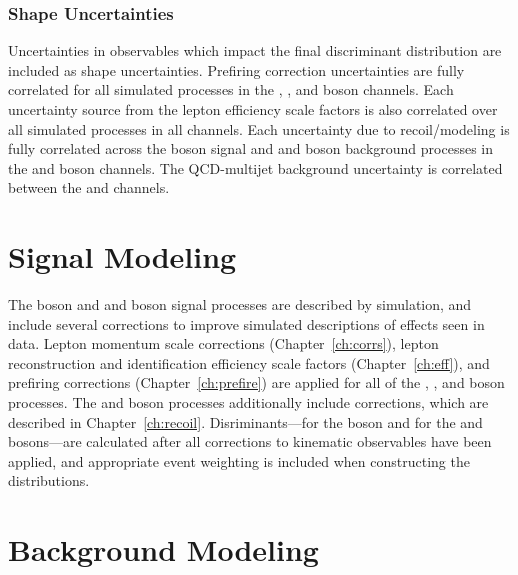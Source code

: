 \subsubsection{Shape Uncertainties}
Uncertainties in observables which impact the final discriminant distribution are included as shape uncertainties. Prefiring correction uncertainties are fully correlated for all simulated processes in the \Wp, \Wm, and \Z boson channels. Each uncertainty source from the lepton efficiency scale factors is also correlated over all simulated processes in all channels. Each uncertainty due to recoil/\met modeling is fully correlated across the \W boson signal and \W and \Z boson background processes in the \Wp and \Wm boson channels. The QCD-multijet background uncertainty is correlated between the \Wp and \Wm channels.

\section{Signal Modeling}\label{ch:sig:sig}
The \Z boson and \Wp and \Wm boson signal processes are described by simulation, and include several corrections to improve simulated descriptions of effects seen in data. Lepton momentum scale corrections (Chapter~\ref{ch:corrs}), lepton reconstruction and identification efficiency scale factors (Chapter~\ref{ch:eff}), and prefiring corrections (Chapter~\ref{ch:prefire}) are applied for all of the \Wp, \Wm, and \Z boson processes. The \Wp and \Wm boson processes additionally include \met corrections, which are described in Chapter~\ref{ch:recoil}. Disriminants---\mll for the \Z boson and \mt for the \Wp and \Wm bosons---are calculated after all corrections to kinematic observables have been applied, and appropriate event weighting is included when constructing the distributions. 

\section{Background Modeling}\label{ch:sig:bkg}

